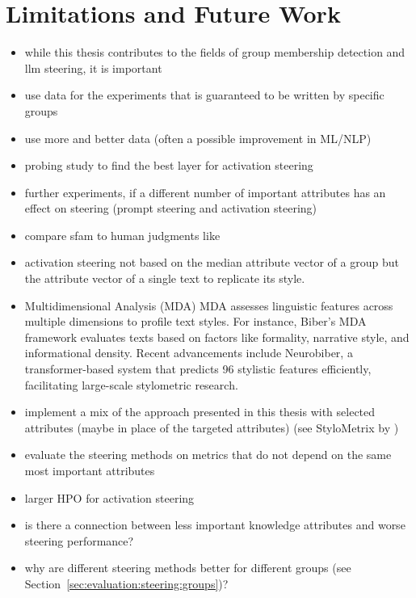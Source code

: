 \section{Limitations and Future Work}
\begin{itemize}
  \item while this thesis contributes to the fields of group membership detection and \ac{llm} steering, it is important
\end{itemize}
\begin{itemize}
  \item use data for the experiments that is guaranteed to be written by specific groups
  \item use more and better data (often a possible improvement in ML/NLP)
  \item probing study to find the best layer for activation steering
  \item further experiments, if a different number of important attributes has an effect on steering (prompt steering and activation steering)
  \item compare \ac{sfam} to human judgments like \citet{patelLearningInterpretableStyle2023}
  \item activation steering not based on the median attribute vector of a group but the attribute vector of a single text to replicate its style.
  \item Multidimensional Analysis (MDA) \newline
        MDA assesses linguistic features across multiple dimensions to profile text styles. For instance, Biber's MDA framework evaluates texts based on factors like formality, narrative style, and informational density. Recent advancements include Neurobiber, a transformer-based system that predicts 96 stylistic features efficiently, facilitating large-scale stylometric research.
  \item implement a mix of the approach presented in this thesis with selected attributes (maybe in place of the targeted attributes) (see StyloMetrix by \citet{okulskaStyloMetrixOpensourceMultilingual2023})
  \item evaluate the steering methods on metrics that do not depend on the same most important attributes
  \item larger HPO for activation steering
  \item is there a connection between less important knowledge attributes and worse steering performance?
  \item why are different steering methods better for different groups (see Section~\ref{sec:evaluation:steering:groups})?
\end{itemize}
